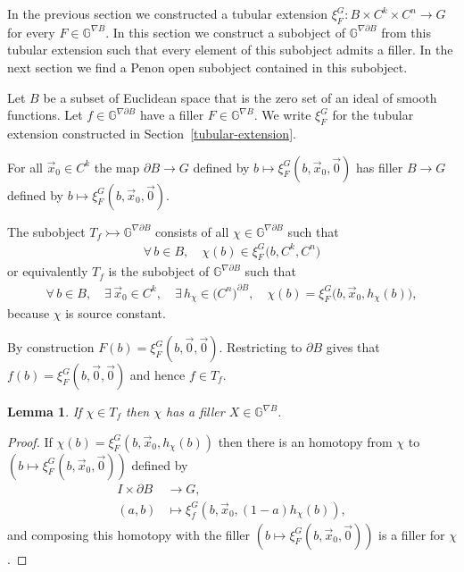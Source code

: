\documentclass[pdftex]{sigma}
\numberwithin{equation}{section}
\newtheorem{Lemma}[Theorem]{Lemma}
\begin{document}
In the previous section we constructed a tubular extension $\xi^G _F\colon B\times C^k\times C^n\rightarrow G$ for every $F\in \mathbb{G}^{\nabla B}$. In this section we construct a subobject of $\mathbb{G}^{\nabla \partial B}$ from this tubular extension such that every element of this subobject admits a f\/iller. In the next section we f\/ind a Penon open subobject contained in this subobject.

\begin{Notation} Let $B$ be a subset of Euclidean space that is the zero set of an ideal of smooth functions. Let $f\in \mathbb{G}^{\nabla\partial B}$ have a f\/iller $F\in \mathbb{G}^{\nabla B}$. We write $\xi^G_F$ for the tubular extension constructed in Section~\ref{tubular-extension}.
\end{Notation}

\begin{Remark} For all $\vec{x}_0\in C^k$ the map $\partial B\rightarrow G$ def\/ined by $b\mapsto \xi^G_F(b,\vec{x}_0,\vec{0})$ has f\/iller $B\rightarrow G$ def\/ined by $b\mapsto \xi^G_F(b,\vec{x}_0,\vec{0})$.
\end{Remark}

\begin{Definition} The subobject $T_f \rightarrowtail \mathbb{G}^{\nabla\partial B}$ consists of all $\chi\in \mathbb{G}^{\nabla\partial B}$ such that
\begin{gather*}\forall\, b\in B, \quad \chi(b)\in \xi^G_F\big(b,C^k,C^n\big)\end{gather*}
or equivalently $T_f$ is the subobject of $\mathbb{G}^{\nabla\partial B}$ such that
\begin{gather*}\forall\, b \in B, \quad \exists\, \vec{x}_0\in C^k, \quad \exists\, h_{\chi}\in \big(C^n\big)^{\partial B}, \quad \chi(b)=\xi^G_F\big(b,\vec{x}_0,h_{\chi}(b)\big),\end{gather*}
because $\chi$ is source constant.
\end{Definition}

\begin{Remark}By construction $F(b)=\xi^G_F(b,\vec{0},\vec{0})$. Restricting to $\partial B$ gives that $f(b)=\xi^G_F(b,\vec{0},\vec{0})$ and hence $f\in T_f$.
\end{Remark}

\begin{Lemma}If $\chi\in T_f$ then $\chi$ has a filler $X\in \mathbb{G}^{\nabla B}$.
\end{Lemma}
\begin{proof}If $\chi(b)=\xi^G_F(b,\vec{x}_0,h_{\chi}(b))$ then there is an homotopy from $\chi$ to $(b\mapsto \xi^G_F(b,\vec{x}_0,\vec{0}))$ def\/ined by
\begin{align*}
I\times \partial B &\rightarrow G,\\
(a,b) &\mapsto \xi^G_f\left(b,\vec{x}_0,(1-a)h_{\chi}(b)\right),
\end{align*}
and composing this homotopy with the f\/iller $(b\mapsto \xi^G_F(b,\vec{x}_0,\vec{0}))$ is a f\/iller for $\chi$.
\end{proof}
\end{document}
